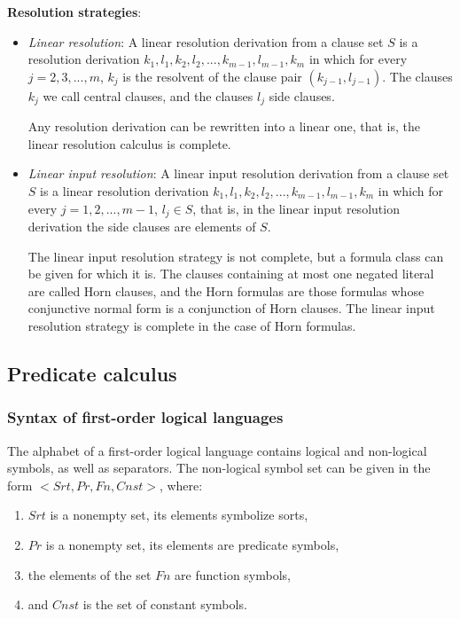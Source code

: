 \documentclass[margin=0px]{article}
\begin{document}
\noindent \textbf{Resolution strategies}:

\begin{itemize}
    \item	\textit{Linear resolution}: A linear resolution derivation from a clause set $S$ is a
          resolution derivation $k_{1},l_{1},k_{2},l_{2}, ..., k_{m-1},l_{m-1}, k_{m}$ in which for every
          $j = 2, 3, ..., m$, $k_{j}$ is the resolvent of the clause pair $(k_{j-1},l_{j-1})$. The clauses $k_{j}$ we call central
          clauses, and the clauses $l_{j}$ side clauses.

          Any resolution derivation can be rewritten into a linear one, that is, the linear resolution calculus is complete.

    \item	\textit{Linear input resolution}: A linear input resolution derivation from a clause set $S$
          is a linear resolution derivation $k_{1},l_{1},k_{2},l_{2}, ..., k_{m-1},l_{m-1}, k_{m}$ in which for every
          $j = 1, 2, ..., m-1$, $l_{j} \in S$, that is, in the linear input resolution derivation the side clauses are elements of $S$.

          The linear input resolution strategy is not complete, but a formula class can be given for which it is. The clauses containing at most one
          negated literal are called Horn clauses, and the Horn formulas are those formulas whose
          conjunctive normal form is a conjunction of Horn clauses. The linear input resolution strategy is complete in the case of Horn formulas.
\end{itemize}

\subsection{Predicate calculus}

\subsubsection{Syntax of first-order logical languages}

The alphabet of a first-order logical language contains logical and non-logical symbols, as well as separators.
The non-logical symbol set can be given in the form $<Srt, Pr, Fn, Cnst>$, where:

\begin{enumerate}
    \item	$Srt$ is a nonempty set, its elements symbolize sorts,

    \item	$Pr$ is a nonempty set, its elements are predicate symbols,

    \item	the elements of the set $Fn$ are function symbols,

    \item	and $Cnst$ is the set of constant symbols.
\end{enumerate}
\end{document}
